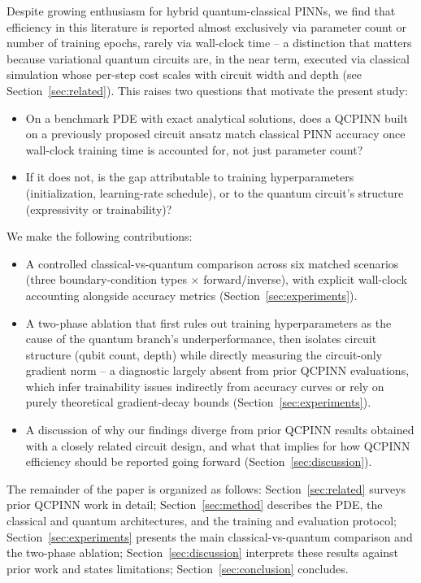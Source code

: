 Despite growing enthusiasm for hybrid quantum-classical PINNs, we find that
efficiency in this literature is reported almost exclusively via parameter
count or number of training epochs, rarely via wall-clock time -- a
distinction that matters because variational quantum circuits are, in the
near term, executed via classical simulation whose per-step cost scales
with circuit width and depth (see Section~\ref{sec:related}). This raises
two questions that motivate the present study:
\begin{itemize}
  \item[\textbf{RQ1}] On a benchmark PDE with exact analytical solutions,
    does a QCPINN built on a previously proposed circuit ansatz
    \citep{farea2025qcpinn} match classical PINN accuracy once wall-clock
    training time is accounted for, not just parameter count?
  \item[\textbf{RQ2}] If it does not, is the gap attributable to
    training hyperparameters (initialization, learning-rate schedule), or
    to the quantum circuit's structure (expressivity or trainability)?
\end{itemize}

We make the following contributions:
\begin{itemize}
  \item A controlled classical-vs-quantum comparison across six matched
    scenarios (three boundary-condition types $\times$ forward/inverse),
    with explicit wall-clock accounting alongside accuracy metrics
    (Section~\ref{sec:experiments}).
  \item A two-phase ablation that first rules out training hyperparameters
    as the cause of the quantum branch's underperformance, then isolates
    circuit structure (qubit count, depth) while directly measuring the
    circuit-only gradient norm -- a diagnostic largely absent from prior
    QCPINN evaluations, which infer trainability issues indirectly from
    accuracy curves or rely on purely theoretical gradient-decay bounds
    (Section~\ref{sec:experiments}).
  \item A discussion of why our findings diverge from prior QCPINN results
    obtained with a closely related circuit design, and what that implies
    for how QCPINN efficiency should be reported going forward
    (Section~\ref{sec:discussion}).
\end{itemize}

The remainder of the paper is organized as follows: Section~\ref{sec:related}
surveys prior QCPINN work in detail; Section~\ref{sec:method} describes the
PDE, the classical and quantum architectures, and the training and
evaluation protocol; Section~\ref{sec:experiments} presents the main
classical-vs-quantum comparison and the two-phase ablation;
Section~\ref{sec:discussion} interprets these results against prior work
and states limitations; Section~\ref{sec:conclusion} concludes.
